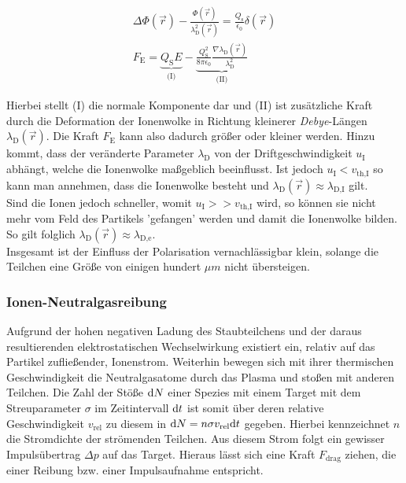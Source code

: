 \documentclass[numbers=noenddot,a4paper]{scrartcl}
\newcommand{\diff}{\textnormal{d}}
\newcommand{\ix}[1]{_\text{#1}}
\newcommand{\tilt}[1]{\textit{#1}}
\begin{document}
					\begin{align}
						\Delta \Phi\left(\vec{r}\right)-\frac{\Phi\left(\vec{r}\right)}{\lambda\ix{D}^2\left(\vec{r}\right)}=\frac{Q\ix{s}}{\epsilon\ix{0}}\delta\left(\vec{r}\right) \\
						F\ix{E}=\underbrace{Q\ix{S}E}_{\text{(I)}}-\underbrace{\frac{Q\ix{S}^2}{8\pi\epsilon\ix{0}}\frac{\nabla\lambda\ix{D}\left(\vec{r}\right)}{\lambda\ix{D}^2}}_{\text{(II)}}
					\end{align}
				
				Hierbei stellt (I) die normale Komponente dar und (II) ist zusätzliche Kraft durch die Deformation der Ionenwolke in Richtung kleinerer \tilt{Debye}-Längen $\lambda\ix{D}\left(\vec{r}\right)$. Die Kraft $F\ix{E}$ kann also dadurch größer oder kleiner werden. Hinzu kommt, dass der veränderte Parameter $\lambda\ix{D}$ von der Driftgeschwindigkeit $u\ix{I}$ abhängt, welche die Ionenwolke maßgeblich beeinflusst. Ist jedoch $u\ix{I}<v\ix{th,I}$ so kann man annehmen, dass die Ionenwolke besteht und $\lambda\ix{D}\left(\vec{r}\right)\approx\lambda\ix{D,I}$ gilt.\\
				Sind die Ionen jedoch schneller, womit $u\ix{I}>>v\ix{th,I}$ wird, so können sie nicht mehr vom Feld des Partikels 'gefangen' werden und damit die Ionenwolke bilden. So gilt folglich $\lambda\ix{D}\left(\vec{r}\right)\approx\lambda\ix{D,e}$.\\
				Insgesamt ist der Einfluss der Polarisation vernachlässigbar klein, solange die Teilchen eine Größe von einigen hundert $\unit{\mu m}$ nicht übersteigen.

			\subsubsection{Ionen-Neutralgasreibung}\label{subsub:reibung}

				Aufgrund der hohen negativen Ladung des Staubteilchens und der daraus resultierenden elektrostatischen Wechselwirkung existiert ein, relativ auf das Partikel zufließender, Ionenstrom. Weiterhin bewegen sich mit ihrer thermischen Geschwindigkeit die Neutralgasatome durch das Plasma und stoßen mit anderen Teilchen. Die Zahl der Stöße $\diff N$ einer Spezies mit einem Target mit dem Streuparameter $\sigma$ im Zeitintervall $\diff t$ ist somit über deren relative Geschwindigkeit $v\ix{rel}$ zu diesem in $\diff N=n\sigma v\ix{rel}\diff t$ gegeben. Hierbei kennzeichnet $n$ die Stromdichte der strömenden Teilchen. Aus diesem Strom folgt ein gewisser Impulsübertrag $\Delta p$ auf das Target. Hieraus lässt sich eine Kraft $F\ix{drag}$ ziehen, die einer Reibung bzw. einer Impulsaufnahme entspricht.
				
\end{document}
